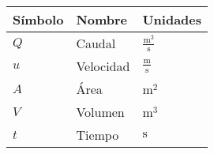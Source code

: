 
\begin{center}
	\renewcommand{\arraystretch}{1.1}
	\begin{tabular}{
			>{\centering\arraybackslash}m{2cm} | 
			>{\raggedright\arraybackslash}m{8cm} | 
			>{\centering\arraybackslash}m{3cm}   
		}
		\textbf{Símbolo} & \textbf{Nombre} & \textbf{Unidades} \\ \hline
		\hypertarget{Q}{$Q$} & Caudal & $\frac{\text{m}^3}{\text{s}}$ \\ 
		\hypertarget{u}{$u$} & Velocidad & $\frac{\text{m}}{\text{s}}$ \\ 
		\hypertarget{A}{$A$} & Área & $\text{m}^2$ \\ 
		\hypertarget{V}{$V$} & Volumen & $\text{m}^3$ \\ 
		\hypertarget{t}{$t$} & Tiempo & $\text{s}$ \\ 
	\end{tabular}
\end{center}
